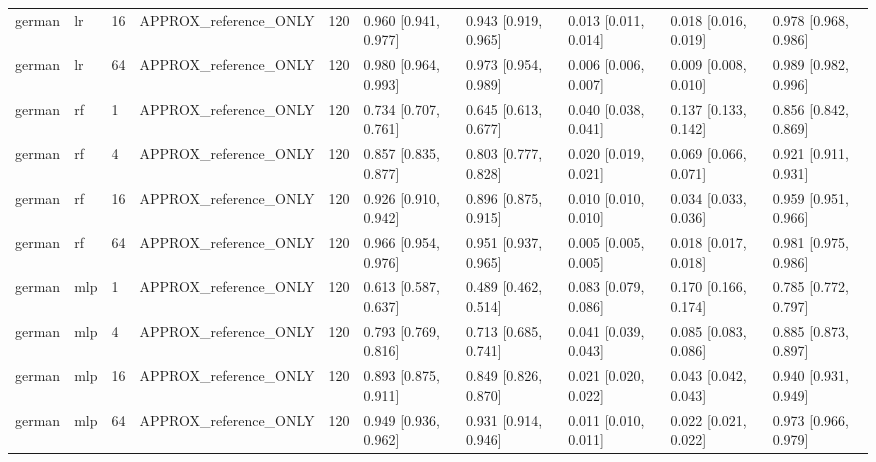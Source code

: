 \begin{tabular}{llllllllll}
german & lr & 16 & APPROX\_reference\_ONLY & 120 & 0.960 [0.941, 0.977] & 0.943 [0.919, 0.965] & 0.013 [0.011, 0.014] & 0.018 [0.016, 0.019] & 0.978 [0.968, 0.986] \\
german & lr & 64 & APPROX\_reference\_ONLY & 120 & 0.980 [0.964, 0.993] & 0.973 [0.954, 0.989] & 0.006 [0.006, 0.007] & 0.009 [0.008, 0.010] & 0.989 [0.982, 0.996] \\
german & rf & 1 & APPROX\_reference\_ONLY & 120 & 0.734 [0.707, 0.761] & 0.645 [0.613, 0.677] & 0.040 [0.038, 0.041] & 0.137 [0.133, 0.142] & 0.856 [0.842, 0.869] \\
german & rf & 4 & APPROX\_reference\_ONLY & 120 & 0.857 [0.835, 0.877] & 0.803 [0.777, 0.828] & 0.020 [0.019, 0.021] & 0.069 [0.066, 0.071] & 0.921 [0.911, 0.931] \\
german & rf & 16 & APPROX\_reference\_ONLY & 120 & 0.926 [0.910, 0.942] & 0.896 [0.875, 0.915] & 0.010 [0.010, 0.010] & 0.034 [0.033, 0.036] & 0.959 [0.951, 0.966] \\
german & rf & 64 & APPROX\_reference\_ONLY & 120 & 0.966 [0.954, 0.976] & 0.951 [0.937, 0.965] & 0.005 [0.005, 0.005] & 0.018 [0.017, 0.018] & 0.981 [0.975, 0.986] \\
german & mlp & 1 & APPROX\_reference\_ONLY & 120 & 0.613 [0.587, 0.637] & 0.489 [0.462, 0.514] & 0.083 [0.079, 0.086] & 0.170 [0.166, 0.174] & 0.785 [0.772, 0.797] \\
german & mlp & 4 & APPROX\_reference\_ONLY & 120 & 0.793 [0.769, 0.816] & 0.713 [0.685, 0.741] & 0.041 [0.039, 0.043] & 0.085 [0.083, 0.086] & 0.885 [0.873, 0.897] \\
german & mlp & 16 & APPROX\_reference\_ONLY & 120 & 0.893 [0.875, 0.911] & 0.849 [0.826, 0.870] & 0.021 [0.020, 0.022] & 0.043 [0.042, 0.043] & 0.940 [0.931, 0.949] \\
german & mlp & 64 & APPROX\_reference\_ONLY & 120 & 0.949 [0.936, 0.962] & 0.931 [0.914, 0.946] & 0.011 [0.010, 0.011] & 0.022 [0.021, 0.022] & 0.973 [0.966, 0.979] \\
\bottomrule
\end{tabular}
